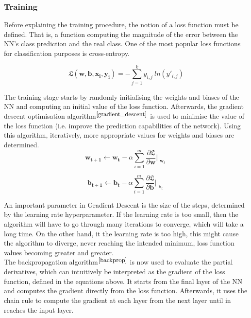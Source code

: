 \subsubsection*{Training}

Before explaining the training procedure, the notion of a loss function must be defined. That is, a function computing the magnitude of the error between the NN's class prediction and the real class. One of the most popular loss functions for classification purposes is cross-entropy.

\begin{equation}
  \mathbf{\mathfrak{L}}(\mathbf{w}, \mathbf{b}, \mathbf{x_i}, \mathbf{y_i}) = - \sum_{j=1}^k y_{i,j} \ ln(y'_{i,j})
\end{equation}

The training stage starts by randomly initialising the weights and biases of the NN and computing an initial value of the loss function. Afterwards, the gradient descent optimisation algorithm$^{\small \cite{gradient_descent}}$ is used to minimise the value of the loss function (i.e. improve the prediction capabilities of the network). Using this algorithm, iteratively, more appropriate values for weights and biases are determined. \\

\begin{equation}
  \mathbf{w_{t+1}} \leftarrow \mathbf{w_t} - \alpha \sum_{i=1}^m \frac{\partial \mathfrak{L}}{\partial \mathbf{w}}\Bigr|_{\substack{\mathbf{w}_t}}
\end{equation}

\begin{equation}
  \mathbf{b_{t+1}} \leftarrow \mathbf{b_t} - \alpha \sum_{i=1}^m \frac{\partial \mathfrak{L}}{\partial \mathbf{b}}\Bigr|_{\substack{\mathbf{b}_t}}
\end{equation}

\bigskip

An important parameter in Gradient Descent is the size of the steps, determined by the learning rate hyperparameter. If the learning rate is too small, then the algorithm will have to go through many iterations to converge, which will take a long time. On the other hand, it the learning rate is too high, this might cause the algorithm to diverge, never reaching the intended minimum, loss function values becoming greater and greater. \\



The backpropagation algorithm$^{\small \cite{backprop}}$ is now used to evaluate the partial derivatives, which can intuitively be interpreted as the gradient of the loss function, defined in the equations above. It starts from the final layer of the NN and computes the gradient directly from the loss function. Afterwards, it uses the chain rule to compute the gradient at each layer from the next layer until in reaches the input layer. \\



